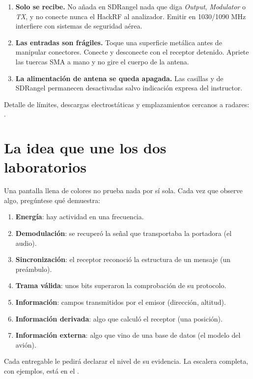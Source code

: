 \begin{alerta}[Seguridad]
\begin{enumerate}
  \item \textbf{Solo se recibe.} No añada en SDRangel nada que diga \emph{Output}, \emph{Modulator} o \emph{TX}, y no conecte nunca el HackRF al analizador. Emitir en 1030/1090 MHz interfiere con sistemas de seguridad aérea.
  \item \textbf{Las entradas son frágiles.} Toque una superficie metálica antes de manipular conectores. Conecte y desconecte con el receptor detenido. Apriete las tuercas SMA a mano y no gire el cuerpo de la antena.
  \item \textbf{La alimentación de antena se queda apagada.} Las casillas  y  de SDRangel permanecen desactivadas salvo indicación expresa del instructor.
\end{enumerate}
Detalle de límites, descargas electrostáticas y emplazamientos cercanos a radares: .
\end{alerta}

\section{La idea que une los dos laboratorios}

Una pantalla llena de colores no prueba nada por sí sola. Cada vez que observe algo, pregúntese qué demuestra:

\begin{enumerate}
  \item \textbf{Energía}: hay actividad en una frecuencia.
  \item \textbf{Demodulación}: se recuperó la señal que transportaba la portadora (el audio).
  \item \textbf{Sincronización}: el receptor reconoció la estructura de un mensaje (un preámbulo).
  \item \textbf{Trama válida}: unos bits superaron la comprobación de su protocolo.
  \item \textbf{Información}: campos transmitidos por el emisor (dirección, altitud).
  \item \textbf{Información derivada}: algo que calculó el receptor (una posición).
  \item \textbf{Información externa}: algo que vino de una base de datos (el modelo del avión).
\end{enumerate}

Cada entregable le pedirá declarar el nivel de su evidencia. La escalera completa, con ejemplos, está en el .
